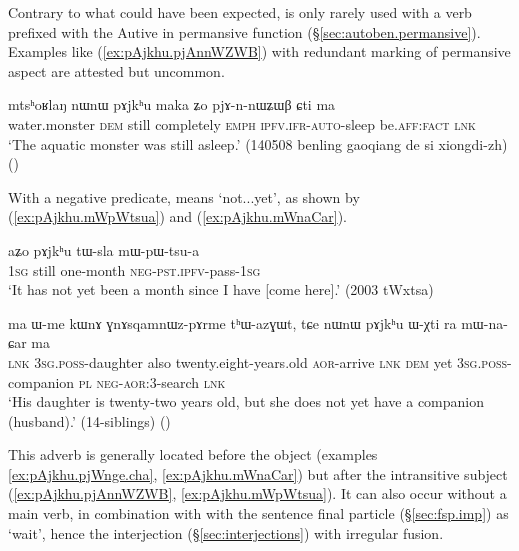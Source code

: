  Contrary to what could have been expected,  is only rarely used with a verb prefixed with the Autive in permansive function (§\ref{sec:autoben.permansive}). Examples like (\ref{ex:pAjkhu.pjAnnWZWB}) with redundant marking of permansive aspect are attested but uncommon.
 
\begin{exe}
\ex \label{ex:pAjkhu.pjAnnWZWB}
\gll mtsʰoʁlaŋ nɯnɯ pɤjkʰu maka ʑo pjɤ-n-nɯʑɯβ ɕti ma \\
water.monster \textsc{dem} still completely \textsc{emph} \textsc{ipfv}.\textsc{ifr}-\textsc{auto}-sleep be.\textsc{aff}:\textsc{fact} \textsc{lnk} \\
\glt `The aquatic monster was still  asleep.' (140508 benling gaoqiang de si xiongdi-zh)
()
  \end{exe}
 
 With a negative predicate,  means `not...yet', as shown by (\ref{ex:pAjkhu.mWpWtsua}) and (\ref{ex:pAjkhu.mWnaCar}).
 
\begin{exe}
\ex \label{ex:pAjkhu.mWpWtsua}
\gll aʑo pɤjkʰu tɯ-sla mɯ-pɯ-tsu-a \\
 \textsc{1sg} still one-month \textsc{neg}-\textsc{pst}.\textsc{ipfv}-pass-\textsc{1sg} \\
 \glt `It has not yet been a month since I have [come here].' (2003 tWxtsa)
\end{exe}

\begin{exe}
\ex \label{ex:pAjkhu.mWnaCar}
\gll ma ɯ-me kɯnɤ ɣnɤsqamnɯz-pɤrme tʰɯ-azɣɯt, tɕe nɯnɯ pɤjkʰu ɯ-χti ra mɯ-na-ɕar ma \\
\textsc{lnk} \textsc{3sg}.\textsc{poss}-daughter also twenty.eight-years.old \textsc{aor}-arrive \textsc{lnk} \textsc{dem} yet \textsc{3sg}.\textsc{poss}-companion \textsc{pl} \textsc{neg}-\textsc{aor}:3\flobv{}-search \textsc{lnk} \\
\glt `His daughter is twenty-two years old, but she does not yet have a companion (husband).' (14-siblings)
()
\end{exe}

This adverb is generally located before the object (examples \ref{ex:pAjkhu.pjWnge.cha}, \ref{ex:pAjkhu.mWnaCar}) but after the intransitive subject (\ref{ex:pAjkhu.pjAnnWZWB}, \ref{ex:pAjkhu.mWpWtsua}).  It can also occur without a main verb, in combination with with the sentence final particle  (§\ref{sec:fsp.imp}) as  `wait', hence the interjection  (§\ref{sec:interjections}) with irregular fusion.
  
